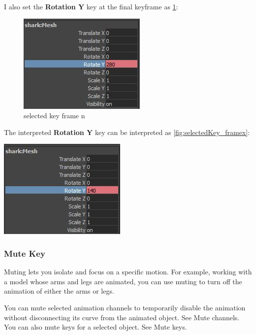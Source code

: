 \documentclass[10pt,a4paper]{article}
\begin{document}
I also set the \textbf{Rotation Y} key at the final keyframe as \ref{fig:selectedKey_framen}:
\begin{figure}[h]
\centering
\includegraphics[scale=0.5]{selectedKey_framen}
\caption{selected key frame n}
\label{fig:selectedKey_framen}
\end{figure}

The interpreted \textbf{Rotation Y} key can be interpreted as \ref{fig:selectedKey_framex}:
\begin{center}
\includegraphics[scale=0.5]{selectedKey_framex}
\label{fig:selectedKey_framex}
\end{center}


\subsubsection{Mute Key}
Muting lets you isolate and focus on a specific motion. For example, working with a model whose arms and legs are animated, you can use muting to turn off the animation of either the arms or legs.

You can mute selected animation channels to temporarily disable the animation without disconnecting its curve from the animated object. See Mute channels. You can also mute keys for a selected object. See Mute keys.
\end{document}
